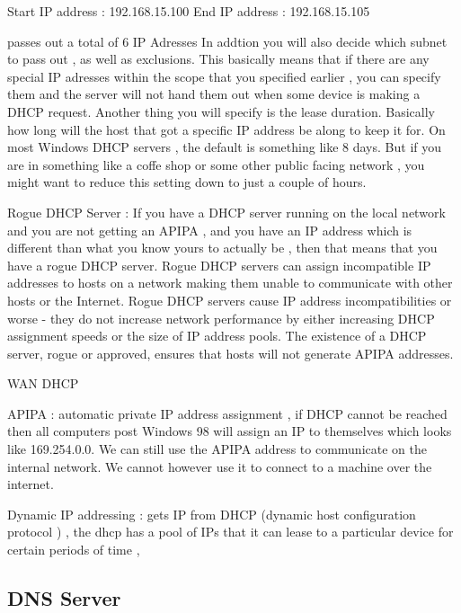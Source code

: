Start IP address : 192.168.15.100
End IP address : 192.168.15.105

passes out a total of 6 IP Adresses
In addtion you will also decide which subnet to pass out , as well as
exclusions. This basically means that if there are any special IP adresses
within the scope that you specified earlier , you can specify them and the
server will not hand them out when some device is making a DHCP request. Another
thing you will specify is the lease duration. Basically how long will the host
that got a specific IP address be along to keep it for. On most Windows DHCP
servers , the default is something like 8 days. But if you are in something like
a coffe shop or some other public facing network , you might want to reduce this
setting down to just a couple of hours.


Rogue DHCP Server : If you have a DHCP server running on the local network and
you are not getting an APIPA , and you have an IP address which is different
than what you know yours to actually be , then that means that you have a rogue
DHCP server.  Rogue DHCP servers can assign incompatible IP addresses to hosts
on a network making them unable to communicate with other hosts or the Internet.
Rogue DHCP servers cause IP address incompatibilities or worse - they do not
increase network performance by either increasing DHCP assignment speeds or the
size of IP address pools. The existence of a DHCP server, rogue or approved,
ensures that hosts will not generate APIPA addresses.

WAN DHCP 

APIPA : automatic private IP address assignment ,  if DHCP cannot be reached
then all computers post Windows 98 will assign an IP to themselves which looks
like 169.254.0.0. We can still use the APIPA address to communicate on the
internal network. We cannot however use it to connect to a machine over the
internet.

Dynamic IP addressing : gets IP from DHCP (dynamic host configuration protocol )
, the dhcp has a pool of IPs that it can lease to a particular device for
certain periods of time ,

\subsectionend

\subsection{DNS Server}
\label{ssec:dns_server}

